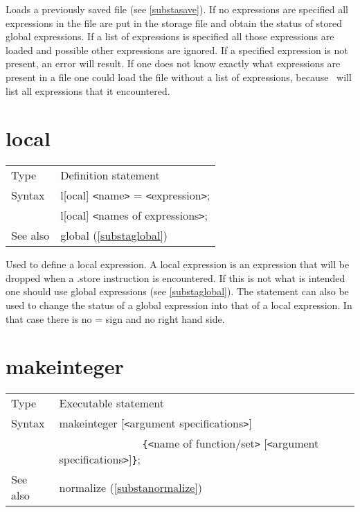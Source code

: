 \noindent Loads a previously saved 
file (see \ref{substasave}). If no expressions are 
specified all expressions in the file are put in the storage 
file and obtain the status of stored global 
expressions. If a list of expressions is specified all those expressions 
are loaded and possible other expressions are ignored. If a specified 
expression is not present, an error will result. If one does not know 
exactly what expressions are present in a file one could load the file 
without a list of expressions, because \FORM\ will list all expressions that 
it encountered. \vspace{10mm}

 
\section{local}
\label{substalocal}

\noindent \begin{tabular}{ll}
Type & Definition statement\\
Syntax & l[ocal] {\tt<}name{\tt>} = {\tt<}expression{\tt>}; \\
       & l[ocal] {\tt<}names of expressions{\tt>};
\\ See also & global (\ref{substaglobal})
\end{tabular} \vspace{4mm}

\noindent Used to define a local expression. A local 
expression is an expression that will be dropped when a 
.store instruction is encountered. If this is not what is 
intended one should use global expressions (see 
\ref{substaglobal}). The statement can also be used to change the status of 
a global expression into that of a local expression. In that case there is 
no = sign and no right hand side. \vspace{10mm}


\section{makeinteger}
\label{substamakeinteger}

\noindent \begin{tabular}{ll}
Type & Executable statement\\
Syntax & makeinteger [{\tt<}argument specifications{\tt>}] \\ &
    \ \ \ \ \ \ \ \ \ \ \ \ \ \ \ 
 \verb:{:{\tt<}name of function/set{\tt>}
[{\tt<}argument specifications{\tt>}]\verb:}:; \\
See also & normalize (\ref{substanormalize})
\end{tabular} \vspace{4mm}

